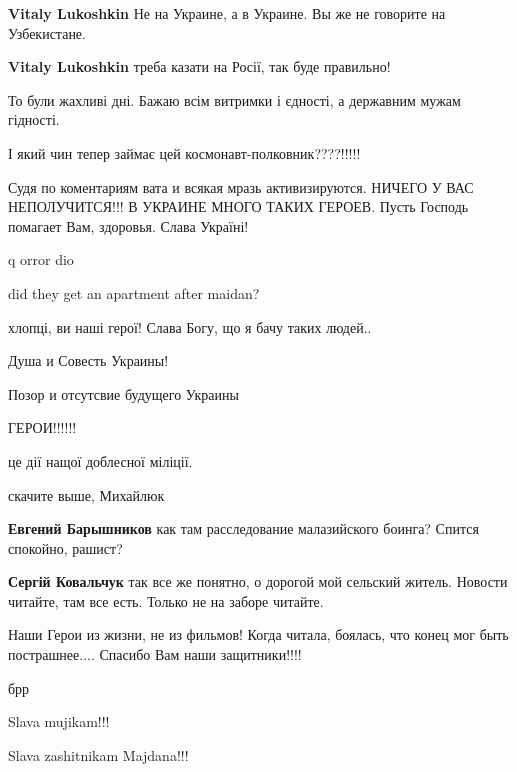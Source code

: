 \begin{itemize} %
\textbf{Vitaly Lukoshkin} Не на Украине, а в Украине. Вы же не говорите на Узбекистане.

\textbf{Vitaly Lukoshkin} треба казати на Росії, так буде правильно!
\end{itemize} %

То були жахливі дні. Бажаю всім витримки і єдності, а державним мужам гідності.

І який чин тепер займає цей космонавт-полковник????!!!!!


Судя по коментариям вата и всякая мразь активизируются. НИЧЕГО У ВАС
НЕПОЛУЧИТСЯ!!! В УКРАИНЕ МНОГО ТАКИХ ГЕРОЕВ. Пусть Господь помагает Вам,
здоровья. Слава Україні!

q orror dio

did they get an apartment after maidan?

хлопці, ви наші герої! Слава Богу, що я бачу таких людей..

Душа и Совесть Украины!

Позор и отсутсвие будущего Украины

ГЕРОИ!!!!!!

це дії нащої доблесної міліції.

скачите выше, Михайлюк

\begin{itemize} %
\textbf{Евгений Барышников} как там расследование малазийского боинга? Спится спокойно, рашист?

\textbf{Сергій Ковальчук} так все же понятно, о дорогой мой сельский житель. Новости читайте, там все есть. Только не на заборе читайте.
\end{itemize} %


Наши Герои из жизни, не из фильмов! Когда читала, боялась, что конец мог быть
пострашнее.... Спасибо Вам наши защитники!!!!

брр

Slava mujikam!!!

Slava zashitnikam Majdana!!!

